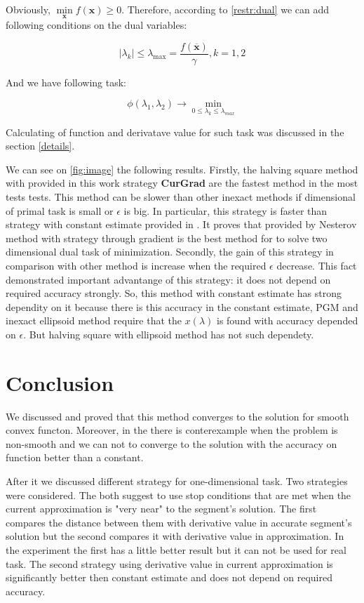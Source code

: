 \documentclass[12pt]{article}
\begin{document}
Obviously, $\min\limits_{\textbf{x}}f(\textbf{x}) \geq 0$. Therefore, according to \ref{restr:dual} we can add following conditions on the dual variables:

$$|\lambda_k| \leq \lambda_{\text{max}}=\frac{f(\overline{\textbf{x}})}{\gamma}, k=1,2$$

And we have following task:

$$\phi(\lambda_1, \lambda_2) \rightarrow \min_{0\leq\lambda_k\leq\lambda_{max}}$$

Calculating of function and derivatave value for such task was discussed in the section \ref{details}.

We can see on \ref{fig:image} the following results. Firstly, the halving square method with provided in this work strategy \textbf{CurGrad} are the fastest method in the most tests tests. This method can be slower than other inexact methods if dimensional of primal task is small or $\epsilon$ is big. In particular, this strategy is faster than strategy with constant estimate provided in \cite{Ston_Pas}. It proves that provided by Nesterov method with strategy through gradient is the best method for to solve two dimensional dual task of minimization. Secondly, the gain of this strategy in comparison with other method is increase when the required $\epsilon$ decrease. This fact demonstrated important advantange of this strategy: it does not depend on required accuracy strongly. So, this method with constant estimate has strong dependity on it because there is this accuracy in the constant estimate, PGM and inexact ellipsoid method require that the $x(\lambda)$ is found with accuracy depended on $\epsilon$. But halving square with ellipsoid method has not such dependety.
\section{Conclusion}

We discussed and proved that this method converges to the solution for smooth convex functon. Moreover, in the \cite{Ston_Pas} there is conterexample when the problem is non-smooth and we can not to converge to the solution with the accuracy on function better than a constant.

After it we discussed different strategy for one-dimensional task. Two strategies were considered. The both suggest to use stop conditions that are met when the current approximation is "very near" to the segment's solution. The first compares the distance between them with derivative value in accurate segment's solution but the second compares it with derivative value in approximation. In the experiment the first has a little better result but it can not be used for real task. The second strategy using derivative value in current approximation is significantly better then constant estimate and does not depend on required accuracy.
\end{document}
